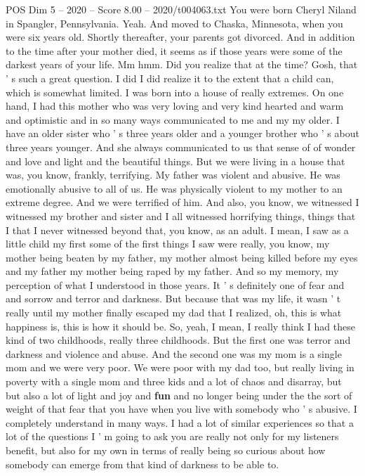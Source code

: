 \begin{textsample}{POS Dim 5 – 2020 – Score 8.00 – 2020/t004063.txt}
You were born Cheryl Niland in Spangler, Pennsylvania.
Yeah.
And moved to Chaska, Minnesota, when you were six years old.
Shortly thereafter, your parents got divorced.
And in addition to the time after your mother died, it seems as if those years were some of the darkest years of your life.
Mm hmm.
Did you realize that at the time?
Gosh, that ' s such a great question.
I did I did realize it to the extent that a child can, which is somewhat limited.
I was born into a house of really extremes.
On one hand, I had this mother who was very loving and very kind hearted and warm and optimistic and in so many ways communicated to me and my my older.
I have an older sister who ' s three years older and a younger brother who ' s about three years younger.
And she always communicated to us that sense of of wonder and love and light and the beautiful things.
But we were living in a house that was, you know, frankly, terrifying.
My father was violent and abusive.
He was emotionally abusive to all of us.
He was physically violent to my mother to an extreme degree.
And we were terrified of him.
And also, you know, we witnessed I witnessed my brother and sister and I all witnessed horrifying things, things that I that I never witnessed beyond that, you know, as an adult.
I mean, I saw as a little child my first some of the first things I saw were really, you know, my mother being beaten by my father, my mother almost being killed before my eyes and my father my mother being raped by my father.
And so my memory, my perception of what I understood in those years.
It ' s definitely one of fear and and sorrow and terror and darkness.
But because that was my life, it wasn ' t really until my mother finally escaped my dad that I realized, oh, this is what happiness is, this is how it should be.
So, yeah, I mean, I really think I had these kind of two childhoods, really three childhoods.
But the first one was terror and darkness and violence and abuse.
And the second one was my mom is a single mom and we were very poor.
We were poor with my dad too, but really living in poverty with a single mom and three kids and a lot of chaos and disarray, but but also a lot of light and joy and \textbf{fun} and no longer being under the the sort of weight of that fear that you have when you live with somebody who ' s abusive.
I completely understand in many ways.
I had a lot of similar experiences so that a lot of the questions I ' m going to ask you are really not only for my listeners benefit, but also for my own in terms of really being so curious about how somebody can emerge from that kind of darkness to be able to.

\end{textsample}
